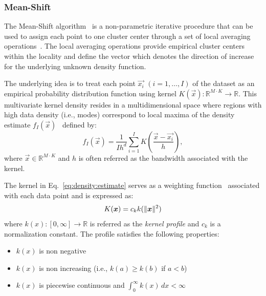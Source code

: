 \subsubsection{Mean-Shift}
\label{Mean-Shift}

The Mean-Shift algorithm~\cite{EstimationGradient} is a non-parametric iterative procedure that can be used to assign each point to one cluster center through a set of local averaging operations~\cite{EstimationGradient}. The local averaging operations provide empirical cluster centers within the locality and define the vector which denotes the direction of increase for the underlying unknown density function.

The underlying idea is to treat each point $\vec{x_{i}}$ $(i=1,\ldots, I)$ of the dataset as an empirical probability distribution function using  kernel $K(\vec{x}): \mathbb{R}^{M\cdot K}\rightarrow \mathbb{R}$. This multivariate kernel density resides in a multidimensional space where regions with high data density (i.e., modes) correspond to local maxima of the density estimate $f_{I}(\vec{x})$~\cite{CacoullosEstimation}  defined by:
\begin{equation}
    f_{I}(\vec{x})=\frac{1}{Ih^{d}}\sum_{i=1}^{I} K\left(\frac{\vec{x}-\vec{x_{i}}}{h}\right),
    \label{eq:density:estimate}
\end{equation}
where $\vec{x}\in \mathbb{R}^{M\cdot K}$ and $h$ is often referred as the bandwidth associated with the kernel.

The kernel in Eq.~\ref{eq:density:estimate} serves as a weighting function~\cite{CacoullosEstimation} associated with each data point and is expressed as:
\begin{equation}
    K(\bm{x})=c_{k} k(\lVert\bm{x}\rVert^{2})
\end{equation}
where $k(x):[0,\infty]\rightarrow \mathbb{R}$ is referred as the \emph{kernel profile} and $c_{k}$ is a normalization constant. The profile satisfies the following properties:
\begin{itemize}
  \item $k(x)$ is non negative
  \item $k(x)$ is non increasing (i.e., $k(a)\geq k(b)$ if $a<b$)
  \item $k(x)$ is piecewise continuous and $\int_0^\infty \! k(x) \, dx < \infty$
\end{itemize}

